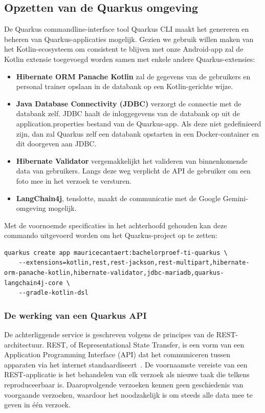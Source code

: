 \subsection{Opzetten van de Quarkus omgeving}
\label{subsec:opzetten-quarkus-omgeving}
De Quarkus commandline-interface tool Quarkus CLI maakt het genereren en beheren van Quarkus-applicaties mogelijk.
Gezien we gebruik willen maken van het Kotlin-ecosysteem om consistent te blijven met onze Android-app zal de Kotlin extensie toegevoegd worden samen met enkele andere Quarkus-extensies:
\begin{itemize}
    \item \textbf{Hibernate ORM Panache Kotlin} zal de gegevens van de gebruikers en personal trainer opslaan in de databank op een Kotlin-gerichte wijze.
    \item \textbf{Java Database Connectivity (JDBC)} verzorgt de connectie met de databank zelf.
    JDBC haalt de inloggegevens van de databank op uit de application.properties bestand van de Quarkus-app.
    Als deze niet gedefinieerd zijn, dan zal Quarkus zelf een databank opstarten in een Docker-container en dit doorgeven aan JDBC\@.
    \item \textbf{Hibernate Validator} vergemakkelijkt het valideren van binnenkomende data van gebruikers.
    Langs deze weg verplicht de API de gebruiker om een foto mee in het verzoek te versturen.
    \item \textbf{LangChain4j}, tenslotte, maakt de communicatie met de Google Gemini-omgeving mogelijk.
\end{itemize}
Met de voornoemde specificaties in het achterhoofd gehouden kan deze commando uitgevoerd worden om het Quarkus-project op te zetten:
\begin{listing}[H]
    \begin{verbatim}
quarkus create app mauricecantaert:bachelorproef-ti-quarkus \
    --extensions=kotlin,rest,rest-jackson,rest-multipart,hibernate-orm-panache-kotlin,hibernate-validator,jdbc-mariadb,quarkus-langchain4j-core \
    --gradle-kotlin-dsl
    \end{verbatim}
\end{listing}

\subsubsection{De werking van een Quarkus API}
\label{subsubsec:werking-api}
De achterliggende service is geschreven volgens de principes van de REST-architectuur.
REST, of Representational State Transfer, is een vorm van een Application Programming Interface (API) dat het communiceren tussen apparaten via het internet standaardiseert~\autocite{Doglio2018}.
De voornaamste vereiste van een REST-applicatie is het behandelen van elk verzoek als nieuwe taak die telkens reproduceerbaar is.
Daaropvolgende verzoeken kennen geen geschiedenis van voorgaande verzoeken, waardoor het noodzakelijk is om steeds alle data mee te geven in één verzoek.

